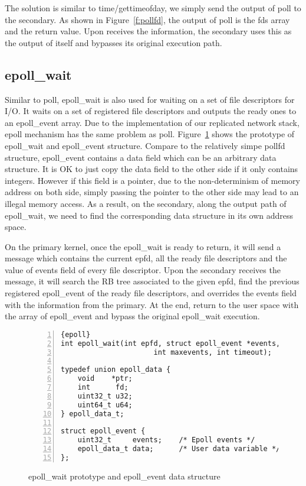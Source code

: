 The solution is similar to time/gettimeofday, we simply send the output of poll to the secondary. As shown in Figure~\ref{f:pollfd}, the output of poll is the fds array and the return value. Upon receives the information, the secondary uses this as the output of itself and bypasses its original execution path.

\subsection{epoll\_wait}
Similar to poll, epoll\_wait is also used for waiting on a set of file descriptors for I/O. It waits on a set of registered file descriptors and outputs the ready ones to an epoll\_event array. Due to the implementation of our replicated network stack, epoll mechanism has the same problem as poll. Figure~\ref{f:epoll} shows the prototype of epoll\_wait and epoll\_event structure. Compare to the relatively simpe pollfd structure, epoll\_event contains a data field which can be an arbitrary data structure. It is OK to just copy the data field to the other side if it only contains integers. However if this field is a pointer, due to the non-determinism of memory address on both side, simply passing the pointer to the other side may lead to an illegal memory access. As a result, on the secondary, along the output path of epoll\_wait, we need to find the corresponding data structure in its own address space.

On the primary kernel, once the epoll\_wait is ready to return, it will send a message which contains the current epfd, all the ready file descriptors and the value of events field of every file descriptor. Upon the secondary receives the message, it will search the RB tree associated to the given epfd, find the previous registered epoll\_event of the ready file descriptors, and overrides the events field with the information from the primary. At the end, return to the user space with the array of epoll\_event and bypass the original epoll\_wait execution.

\begin{figure}
\begin{lstlisting}[numbers=left, frame=single, basicstyle=\small, breaklines]{epoll}
int epoll_wait(int epfd, struct epoll_event *events,
                      int maxevents, int timeout);

typedef union epoll_data {
    void    *ptr;
    int      fd;
    uint32_t u32;
    uint64_t u64;
} epoll_data_t;

struct epoll_event {
    uint32_t     events;    /* Epoll events */
    epoll_data_t data;      /* User data variable */
};

\end{lstlisting}
\caption{epoll\_wait prototype and epoll\_event data structure}
\label{f:epoll}
\end{figure}

